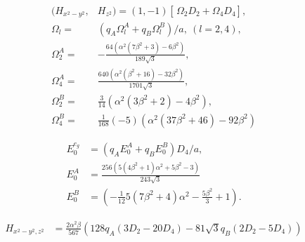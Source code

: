 \documentclass[a4paper,prb]{revtex4-1}  %
\newcommand{\com}[1]{}
\begin{document}
\begin{align}
(H_{x^2-y^2},&H_{z^2}) = (1,-1)
\left[\frac{}{} \Omega_{2}  D_2 + \Omega_4 D_4\right],\\
\Omega_{l} =&  \left(q_A \Omega_{l}^A + q_B\Omega_{l}^B\right)/a,~(l=2,4),\\
\Omega_{2}^A =&  -\frac{64 \left(\alpha ^2 \left(7 \beta ^2+3\right)-6 \beta ^2\right)}{189 \sqrt{3}},\\
\Omega_{4}^A =& \frac{640 \left(\alpha ^2 \left(\beta ^2+16\right)-32 \beta ^2\right)}{1701 \sqrt{3}},\\
\Omega_{2}^B =&  \frac{3}{14} \left(\alpha ^2 \left(3 \beta ^2+2\right)-4 \beta ^2\right),\\
\Omega_{4}^B =& \frac{1}{168} (-5) \left(\alpha ^2 \left(37 \beta ^2+46\right)-92 \beta ^2\right)
\end{align}


\begin{align}
E_0^{e_{g}} &= \left(q_A E_0^A +q_B E_0^B\right)D_4/a,\\
E_0^A &=
\frac{256 \left(5 \left(4 \beta ^2+1\right) \alpha ^2+5 \beta ^2-3\right)}{243 \sqrt{3}}\\
E_0^B &=
(-\frac{1}{12} 5 \left(7 \beta ^2+4\right) \alpha ^2-\frac{5 \beta ^2}{3}+1).
\end{align}


\com{
\begin{align}
H_{x^2-y^2,z^2}&=
\left[\frac{}{} \Lambda_{2}  D_2 + \Lambda_4 D_4\right],\\
\Lambda_{l} =&  \left(q_A \Lambda_{l}^A + q_B\Lambda_{l}^B\right)/a,~(l=2,4),\\
\Lambda_{2}^A =&
\frac{256 \alpha ^2 \beta }{189},\\
\Lambda_{4}^A =&
-\frac{1}{567} \left(5120 \alpha ^2 \beta \right),\\
\Lambda_{2}^B =&\frac{1}{7} (-4) \sqrt{3} \alpha ^2 \beta ,\\
\Lambda_{4}^B =&\frac{10}{7} \sqrt{3} \alpha ^2 \beta
\end{align}
}

\begin{align}
H_{x^2-y^2,z^2}&=
\frac{2\alpha ^2 \beta}{567} 
\left(128 q_A (3 D_2-20 D_4) - 81 \sqrt{3} q_B (2 D_2 -5 D_4)\right)
\end{align}
\end{document}
